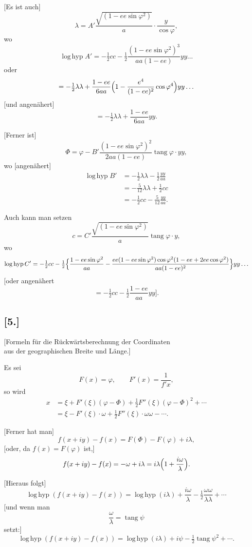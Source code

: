 \documentclass[12pt,a4paper]{article}
\newcommand{\tang}{\operatorname{tang}}
\newcommand{\loghyp}{\operatorname{log\,hyp}}
\begin{document}
[Es ist auch]
\[
\lambda = A'\frac{\sqrt{(1-ee\sin\varphi^2)}}{a}\cdot\frac{y}{\cos\varphi},
\]
wo
\[
\loghyp A' = -\tfrac{1}{2}cc - \tfrac{1}{2}\frac{(1-ee\sin\varphi^2)^3}{aa(1-ee)}yy\ldots
\]
oder
\[
= -\tfrac{1}{2}\lambda\lambda + \frac{1-ee}{6aa}\Bigl(1-\frac{e^4}{(1-ee)^2}\cos\varphi^4\Bigr)yy\ldots
\]
[und angenähert]
\[
= -\tfrac{1}{2}\lambda\lambda + \frac{1-ee}{6aa}yy.
\]

[Ferner ist]
\[
\Phi = \varphi - B'\frac{(1-ee\sin\varphi^2)^2}{2aa(1-ee)}\tang\varphi\cdot yy,
\]
wo [angenähert]
\begin{align*}
\loghyp B' &= -\tfrac{1}{2}\lambda\lambda - \tfrac{1}{2}\frac{yy}{aa}\\
&= -\tfrac{5}{12}\lambda\lambda + \tfrac{1}{2}cc\\
&= -\tfrac{1}{2}cc - \tfrac{5}{12}\frac{yy}{aa}.
\end{align*}

Auch kann man setzen
\[
c = C'\frac{\sqrt{(1-ee\sin\varphi^2)}}{a}\tang\varphi\cdot y,
\]
wo
\[
\loghyp C' = -\tfrac{1}{2}cc - \tfrac{1}{2}\Bigl\{\frac{1-ee\sin\varphi^2}{aa} - \frac{ee(1-ee\sin\varphi^2)\cos\varphi^2(1-ee+2ee\cos\varphi^2)}{aa(1-ee)^2}\Bigr\}yy\ldots
\]
[oder angenähert
\[
= -\tfrac{1}{2}cc - \tfrac{1}{2}\frac{1-ee}{aa}yy\Bigr].
\]

\subsection*{[5.]}
\begin{center}
[Formeln für die Rückwärtsberechnung der Coordinaten\\aus der geographischen Breite und Länge.]
\end{center}

Es sei
\[
F(x) = \varphi,\qquad F'(x) = \frac{1}{f'x},
\]
so wird
\begin{align*}
x &= \xi + F'(\xi)(\varphi-\Phi) + \tfrac{1}{2}F''(\xi)(\varphi-\Phi)^2 + \cdots\\
&= \xi - F'(\xi)\cdot\omega + \tfrac{1}{2}F''(\xi)\cdot\omega\omega - \cdots.
\end{align*}

[Ferner hat man]
\[
f(x+iy) - f(x) = F(\Phi) - F(\varphi) + i\lambda,
\]
[oder, da $f(x) = F(\varphi)$ ist,]
\[
f(x+iy) - f(x) = -\omega + i\lambda = i\lambda\Bigl(1 + \frac{i\omega}{\lambda}\Bigr).
\]

[Hieraus folgt]
\[
\loghyp(f(x+iy)-f(x)) = \loghyp(i\lambda) + \frac{i\omega}{\lambda} - \tfrac{1}{2}\frac{\omega\omega}{\lambda\lambda} + \cdots
\]
[und wenn man
\[
\frac{\omega}{\lambda} = \tang\psi
\]
setzt:]
\[
\loghyp(f(x+iy)-f(x)) = \loghyp(i\lambda) + i\psi - \tfrac{1}{2}\tang\psi^2 + \cdots.
\]
\end{document}
